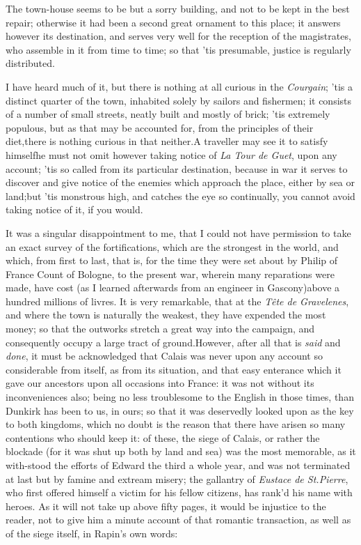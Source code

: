 \documentclass{article}
\begin{document}
The town-house seems to be but a sorry building, and not to be
kept in the best repair; otherwise it had been a second great
ornament to this place; it answers however its destination, and
serves very well for the reception of the magistrates, who assemble
in it from time to time; so that ’tis presumable, justice is
regularly distributed.

I have heard much of it, but there is nothing at all curious in
the \textit{Courgain}; ’tis a distinct quarter of the town,
inhabi\-ted solely by sailors and fishermen; it consists of a number
of small streets, neatly built and mostly of brick; ’tis
extremely populous, but as that may be accounted for, from the
principles of their diet,\tsk there is nothing curious in that
neither.\tsh A traveller may see it to satisfy
himself\tsk he must not omit however taking notice of \textit{La Tour de Guet}, upon
any account; ’tis so called from its particular destination,
because in war it serves to discover and give notice of the enemies
which approach the place, either by sea or land;\tsh but
’tis monstrous high, and catches the eye so continually, you
cannot avoid taking notice of it, if you would.

It was a singular disappointment to me, that I could not have
permission to take an exact survey of the fortifications, which are
the strongest in the world, and which, from first to last, that is,
for the time they were set about by Philip of France
Count of Bologne, to the present war, wherein many
reparations were made, have cost (as I learned afterwards from an
engineer in Gascony)\tsk above a hundred millions of
livres. It is very remarkable, that at the \textit{Tête de
Gra\-ve\-lenes}, and where the town is naturally the weakest, they
have expended the most money; so that the outworks stretch a great
way into the campaign, and consequently occupy a large tract of
ground.\break\tsk However, after all that is \textit{said} and
\textit{done}, it must be acknowledged that Calais was never
upon any account so considerable from itself, as from its
situation, and that easy enterance which it gave our ancestors upon
all occasions into France: it was not without its
inconveniences also; being no less troublesome to the
English in those times, than Dunkirk has been to us,
in ours; so that it was deservedly looked upon as the key to both
kingdoms, which no doubt is the reason that there have arisen so
many contentions who should keep it: of these, the siege of
Calais, or rather the blockade (for it was shut up both by
land and sea) was the most memorable, as it with-stood the efforts
of Edward the third a whole year, and was not terminated at
last but by famine and extream misery; the gallantry of \textit{Eustace
de St.\@ Pierre}, who first offered himself a victim for his
fellow citizens, has rank’d his name with heroes. As it will
not take up above fifty pages, it would be injustice to the reader,
not to give him a minute account of that romantic transaction, as well
as of the siege itself, in Rapin’s own words:
\end{document}
